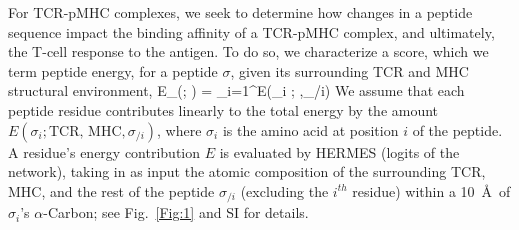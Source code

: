 For TCR-pMHC complexes, we seek to determine how changes in a peptide sequence impact the binding
affinity of a TCR-pMHC complex, and ultimately, the T-cell response to the antigen. To do so, we
characterize a score, which we term peptide energy, for a peptide $\sigma$, given its surrounding
TCR and MHC structural environment,
\EQ
E_{}(\sigma ; ) = \sum_{i=1}^\ell E(\sigma_i ; ,\sigma_{/i})
\label{eq:pepEn}
\EE
We assume that each peptide residue contributes linearly to the total energy by the amount
$E(\sigma_i ; \text{TCR, MHC}, \sigma_{/i})$, where $\sigma_i$ is the amino acid at position $i$ of
the peptide. A residue's energy contribution $E$ is evaluated by HERMES (logits of the network),
taking in as input the atomic composition of the surrounding TCR, MHC, and the rest of the peptide
$\sigma_{/i}$ (excluding the $i^{th}$ residue) within a 10~\AA~of $\sigma_i$'s $\alpha$-Carbon; see
Fig.~\ref{Fig:1} and SI for details.

